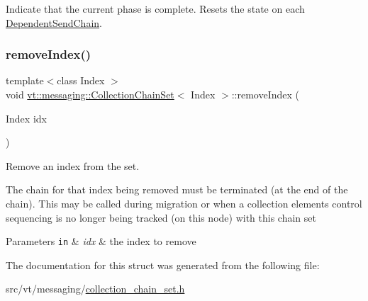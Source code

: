 Indicate that the current phase is complete. Resets the state on each {\ttfamily \hyperlink{classvt_1_1messaging_1_1_dependent_send_chain}{Dependent\+Send\+Chain}}. 

\mbox{\label{classvt_1_1messaging_1_1_collection_chain_set_a299e52c482aba47bcdabe796d236c043}} 
\subsubsection{\texorpdfstring{remove\+Index()}{removeIndex()}}
{\footnotesize\ttfamily template$<$class Index $>$ \\
void \hyperlink{classvt_1_1messaging_1_1_collection_chain_set}{vt\+::messaging\+::\+Collection\+Chain\+Set}$<$ Index $>$\+::remove\+Index (\begin{DoxyParamCaption}\item[{Index}]{idx }\end{DoxyParamCaption})\hspace{0.3cm}{\ttfamily [inline]}}



Remove an index from the set. 

The chain for that index being removed must be terminated (at the end of the chain). This may be called during migration or when a collection element\textquotesingle{}s control sequencing is no longer being tracked (on this node) with this chain set


\begin{DoxyParams}[1]{Parameters}
\mbox{\tt in}  & {\em idx} & the index to remove \\
\hline
\end{DoxyParams}


The documentation for this struct was generated from the following file\+:\begin{DoxyCompactItemize}
\item 
src/vt/messaging/\hyperlink{collection__chain__set_8h}{collection\+\_\+chain\+\_\+set.\+h}\end{DoxyCompactItemize}
